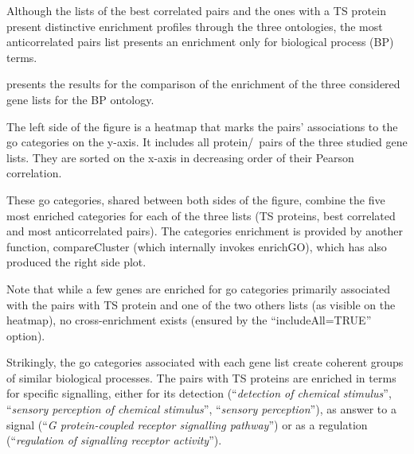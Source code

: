 Although the lists of the best correlated pairs and
the ones with a \gls{TS} protein present distinctive enrichment profiles
through the three ontologies,
the most anticorrelated pairs list presents
an enrichment only for biological process (BP) terms.

 presents the results for
the comparison of the enrichment of the three considered gene lists
for the BP ontology.

The left side of the figure is a heatmap
that marks the pairs' associations to the \gls{go} categories on the y-axis.
It includes all protein/\mRNA\ pairs of the three studied gene lists.
They are sorted on the x-axis in decreasing order of their Pearson correlation.

These \gls{go} categories, shared between both sides of the figure,
combine the five most enriched categories
for each of the three lists (\gls{TS} proteins, best correlated
and most anticorrelated pairs).
The categories enrichment is provided by another  function,
\textsf{compareCluster} (which internally invokes \textsf{enrichGO}),
which has also produced the right side plot.\\
\vspace{-\baselineskip}

Note that while a few genes are enriched for \gls{go} categories primarily
associated with the pairs with \gls{TS} protein and one of the two others lists
(as visible on the heatmap),
no cross-enrichment exists
(ensured by the \enquote{\textsf{includeAll=TRUE}} option).\\
\vspace{-\baselineskip}

Strikingly, the \gls{go} categories associated with each gene list create
coherent groups of similar biological processes.
The pairs with \gls{TS} proteins are enriched in terms for specific signalling,
either for its detection (\enquote{\textit{detection of chemical stimulus}},
\enquote{\textit{sensory perception of chemical stimulus}},
\enquote{\textit{sensory perception}}),
as answer to a signal (\enquote{\textit{G protein-coupled receptor signalling pathway}})
or as a regulation (\enquote{\textit{regulation of signalling receptor activity}}).

